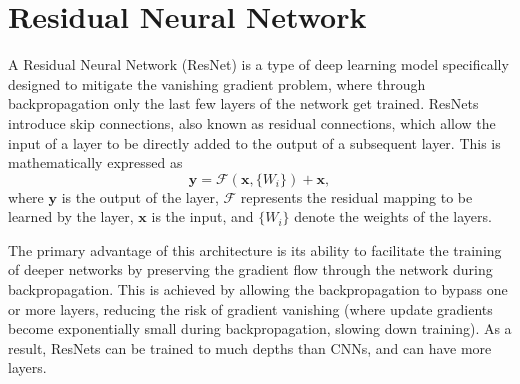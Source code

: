 





\section{Residual Neural Network}


A Residual Neural Network (ResNet) is a type of deep learning model specifically designed to mitigate the vanishing gradient problem, where through backpropagation only the last few layers of the network get trained. ResNets introduce skip connections, also known as residual connections, which allow the input of a layer to be directly added to the output of a subsequent layer. This is mathematically expressed as
\[
	\mathbf{y} = \mathcal{F}(\mathbf{x}, \{W_i\}) + \mathbf{x},
\]
where $\mathbf{y}$ is the output of the layer, $\mathcal{F}$ represents the residual mapping to be learned by the layer, $\mathbf{x}$ is the input, and $\{W_i\}$ denote the weights of the layers.

The primary advantage of this architecture is its ability to facilitate the training of deeper networks by preserving the gradient flow through the network during backpropagation. This is achieved by allowing the backpropagation to bypass one or more layers, reducing the risk of gradient vanishing (where update gradients become exponentially small during backpropagation, slowing down training). As a result, ResNets can be trained to much depths than CNNs, and can have more layers.




